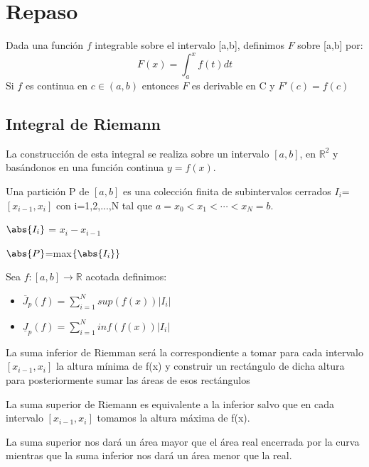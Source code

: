 \documentclass{apuntes}
\begin{document}
\chapter{Repaso}
\begin{theorem}
Dada una función $f$ integrable sobre el intervalo [a,b], definimos $F$ sobre [a,b] por:
\[F(x)=\int_{a}^{x}f(t)dt\]
Si $f$ es continua en $c\in (a,b)$ entonces $F$ es derivable en C y $F'(c)=f(c)$
\end{theorem}

\section{Integral de Riemann}
La construcción de esta integral se realiza sobre un intervalo $[a,b]$, en $\mathbb{R}^2$ y basándonos en una función continua $y=f(x)$.

\begin{defn}[Partición]
Una partición P de $[a,b]$ es una colección finita de subintervalos cerrados $I_i$=$[x_{i-1}, x_i]$ con i=1,2,...,N tal que $a=x_0<x_1<\cdots < x_N=b$.

$\abs{I_i}$ = $x_i-x_{i-1}$

$\abs{P}$=max$\lbrace \abs{I_i} \rbrace$
\end{defn}


Sea $f:[ a,b ] \rightarrow \mathbb{R}$ acotada definimos:
\begin{itemize}
\item \begin{defn}
$\overline{J}_p(f)=\sum_{i=1}^{N}sup(f(x))|I_i|$
\end{defn}

\item \begin{defn}
$\underline{J}_p(f)=\sum_{i=1}^{N}inf(f(x))|I_i|$
\end{defn}
\end{itemize}

La suma inferior de Riemman será la correspondiente a tomar para cada intervalo $[x_{i-1}, x_i]$ la altura mínima de f(x) y construir un rectángulo de dicha altura para posteriormente sumar las áreas de esos rectángulos

La suma superior de Riemann es equivalente a la inferior salvo que en cada intervalo $[x_{i-1}, x_i]$ tomamos la altura máxima de f(x).

La suma superior nos dará un área mayor que el área real encerrada por la curva mientras que la suma inferior nos dará un área menor que la real.
\end{document}
